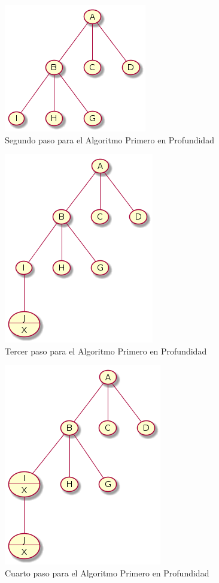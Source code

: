 \documentclass{article}
\begin{document}
\begin{figure}[H]
  \centering
  \includegraphics[width=.4\linewidth]{EJ3/profundidad_001.png}
  \caption{Segundo paso para el Algoritmo Primero en Profundidad}
  \label{gr:g3}
\end{figure}

\begin{figure}[H]
  \centering
  \includegraphics[width=.4\linewidth]{EJ3/profundidad_002.png}
  \caption{Tercer paso para el Algoritmo Primero en Profundidad}
  \label{gr:g4}
\end{figure}
\begin{figure}[H]
  \centering
  \includegraphics[width=.4\linewidth]{EJ3/profundidad_003.png}
  \caption{Cuarto paso para el Algoritmo Primero en Profundidad}
  \label{gr:g5}
\end{figure}
\end{document}
